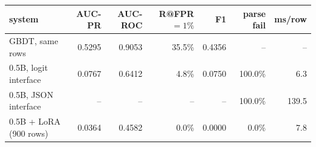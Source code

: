 \begin{tabular}{lrrrrrr}
\toprule
system & AUC-PR & AUC-ROC & R@FPR$=1\%$ & F1 & parse fail & ms/row \\
\midrule
GBDT, same rows & 0.5295 & 0.9053 & 35.5\% & 0.4356 & -- & -- \\
0.5B, logit interface & 0.0767 & 0.6412 & 4.8\% & 0.0750 & 100.0\% & 6.3 \\
0.5B, JSON interface & -- & -- & -- & -- & 100.0\% & 139.5 \\
0.5B + LoRA (900 rows) & 0.0364 & 0.4582 & 0.0\% & 0.0000 & 0.0\% & 7.8 \\
\bottomrule
\end{tabular}
